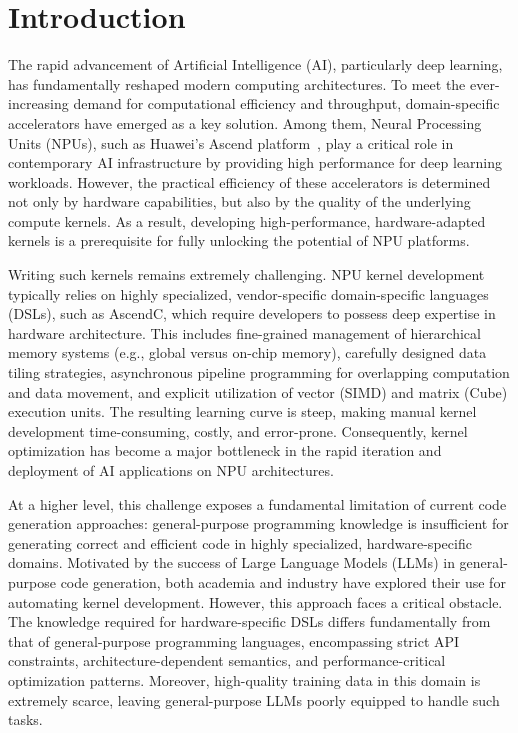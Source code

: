 \section{Introduction}

The rapid advancement of Artificial Intelligence (AI), particularly deep learning, has fundamentally reshaped modern computing architectures. To meet the ever-increasing demand for computational efficiency and throughput, domain-specific accelerators have emerged as a key solution. Among them, Neural Processing Units (NPUs), such as Huawei's Ascend platform~\cite{liao2021ascend, xue2024unlocking, wroblewski2025parallel}, play a critical role in contemporary AI infrastructure by providing high performance for deep learning workloads. However, the practical efficiency of these accelerators is determined not only by hardware capabilities, but also by the quality of the underlying compute kernels. As a result, developing high-performance, hardware-adapted kernels is a prerequisite for fully unlocking the potential of NPU platforms.

Writing such kernels remains extremely challenging. NPU kernel development typically relies on highly specialized, vendor-specific domain-specific languages (DSLs), such as AscendC, which require developers to possess deep expertise in hardware architecture. This includes fine-grained management of hierarchical memory systems (e.g., global versus on-chip memory), carefully designed data tiling strategies, asynchronous pipeline programming for overlapping computation and data movement, and explicit utilization of vector (SIMD) and matrix (Cube) execution units. The resulting learning curve is steep, making manual kernel development time-consuming, costly, and error-prone. Consequently, kernel optimization has become a major bottleneck in the rapid iteration and deployment of AI applications on NPU architectures.

At a higher level, this challenge exposes a fundamental limitation of current code generation approaches: general-purpose programming knowledge is insufficient for generating correct and efficient code in highly specialized, hardware-specific domains. Motivated by the success of Large Language Models (LLMs) in general-purpose code generation, both academia and industry have explored their use for automating kernel development. However, this approach faces a critical obstacle. The knowledge required for hardware-specific DSLs differs fundamentally from that of general-purpose programming languages, encompassing strict API constraints, architecture-dependent semantics, and performance-critical optimization patterns. Moreover, high-quality training data in this domain is extremely scarce, leaving general-purpose LLMs poorly equipped to handle such tasks.

